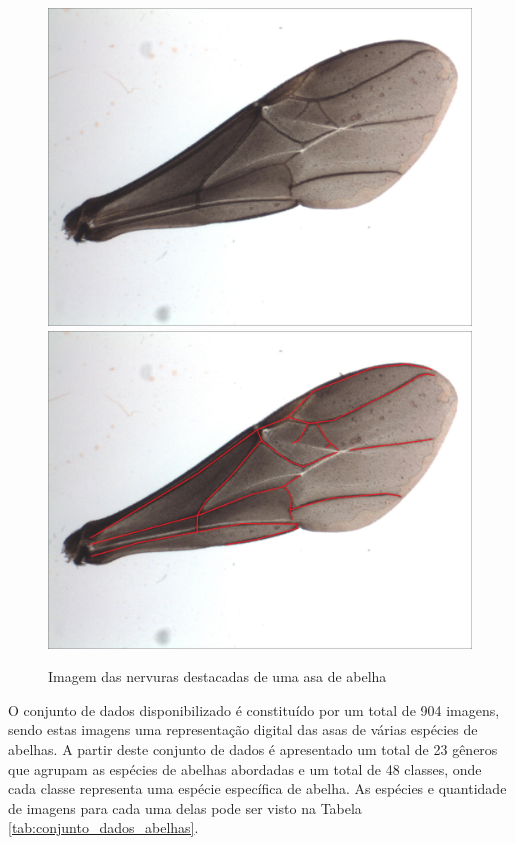 \documentclass[
	12pt,				%
	oneside,			%
	a4paper,			%
	english,			%
	brazil				%
	]{abntex2ppgsi}
\begin{document}
\begin{figure}[H]
    \centering
    \caption{Imagem das nervuras destacadas de uma asa de abelha}
    \includegraphics[width=.45\textwidth]{imagens/materiais_metodos/02_mel_trigona_spinipes.jpg}\hfill
    \includegraphics[width=.45\textwidth]{imagens/materiais_metodos/02_mel_trigona_spinipes_mapped.jpg}
    \label{fig:02_mel_trigona_spinipes}
\end{figure}

O conjunto de dados disponibilizado é constituído por um total de 904 imagens, sendo estas imagens uma representação digital das asas de várias espécies de abelhas. A partir deste conjunto de dados é apresentado um total de 23 gêneros que agrupam as espécies de abelhas abordadas e um total de 48 classes, onde cada classe representa uma espécie específica de abelha. As espécies e quantidade de imagens para cada uma delas pode ser visto na Tabela \ref{tab:conjunto_dados_abelhas}.
\end{document}
